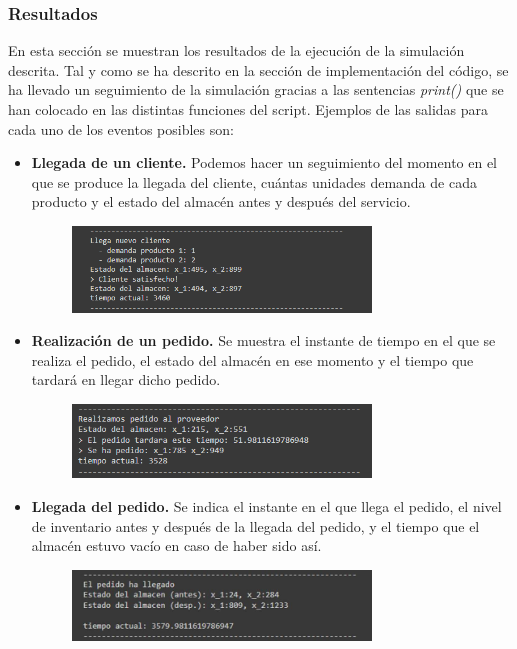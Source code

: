 \documentclass[a4paper,12pt]{article}
\begin{document}
	\subsubsection{Resultados}
	En esta sección se muestran los resultados de la ejecución de la simulación descrita. Tal y como
	se ha descrito en la sección de implementación del código, se ha llevado un seguimiento de la
	simulación gracias a las sentencias \textit{print()} que se han colocado en las distintas funciones del script.
Ejemplos de las salidas para cada uno de los eventos posibles son:
	\begin{itemize}
		\item \textbf{Llegada de un cliente.} Podemos hacer un seguimiento del momento en el que se produce
la llegada del cliente, cuántas unidades demanda de cada producto y el estado del almacén
antes y después del servicio.
		\begin{figure}[H]
			\centering
			\includegraphics[width=0.75\textwidth]{include/llegada_cliente.png}
		\end{figure}
		
		\item \textbf{Realización de un pedido.} Se muestra el instante de tiempo en el que se realiza el pedido,
el estado del almacén en ese momento y el tiempo que tardará en llegar dicho pedido.
		\begin{figure}[H]
			\centering
			\includegraphics[width=0.75\textwidth]{include/realizacion_pedido.png}
		\end{figure}
	
		\item \textbf{Llegada del pedido.} Se indica el instante en el que llega el pedido, el nivel de inventario
 antes y después de la llegada del pedido, y el tiempo que el almacén estuvo vacío en caso
de haber sido así.
		\begin{figure}[H]
			\centering
			\includegraphics[width=0.75\textwidth]{include/llegada_pedido.png}
		\end{figure}
		
	\end{itemize}
\end{document}
